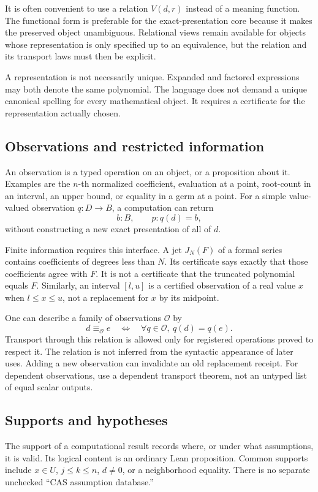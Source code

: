 \documentclass[11pt,a4paper]{article}
\theoremstyle{definition}
\begin{document}
It is often convenient to use a relation \(V(d,r)\) instead of a meaning function.
The functional form is preferable for the exact-presentation core because it
makes the preserved object unambiguous. Relational views remain available for
objects whose representation is only specified up to an equivalence, but the
relation and its transport laws must then be explicit.

A representation is not necessarily unique. Expanded and factored expressions
may both denote the same polynomial. The language does not demand a unique
canonical spelling for every mathematical object. It requires a certificate for
the representation actually chosen.

\subsection{Observations and restricted information}
An observation is a typed operation on an object, or a proposition about it.
Examples are the \(n\)-th normalized coefficient, evaluation at a point,
root-count in an interval, an upper bound, or equality in a germ at a point.
For a simple value-valued observation \(q:D\to B\), a computation can return
\[
 b:B,\qquad p:q(d)=b,
\]
without constructing a new exact presentation of all of \(d\).

Finite information requires this interface. A jet \(J_N(F)\) of a formal series
contains coefficients of degrees less than \(N\). Its certificate says exactly
that those coefficients agree with \(F\). It is not a certificate that the
truncated polynomial equals \(F\). Similarly, an interval \([l,u]\) is a certified
observation of a real value \(x\) when \(l\leq x\leq u\), not a replacement for
\(x\) by its midpoint.

One can describe a family of observations \(\mathcal O\) by
\[
 d\equiv_{\mathcal O}e
 \quad\Longleftrightarrow\quad
 \forall q\in\mathcal O,\ q(d)=q(e).
\]
Transport through this relation is allowed only for registered operations proved
to respect it. The relation is not inferred from the syntactic appearance of
later uses. Adding a new observation can invalidate an old replacement receipt.
For dependent observations, use a dependent transport theorem, not an untyped
list of equal scalar outputs.

\subsection{Supports and hypotheses}
The support of a computational result records where, or under what assumptions,
it is valid. Its logical content is an ordinary Lean proposition. Common supports
include \(x\in U\), \(j\leq k\leq n\), \(d\neq0\), or a neighborhood equality.
There is no separate unchecked ``CAS assumption database.''
\end{document}
